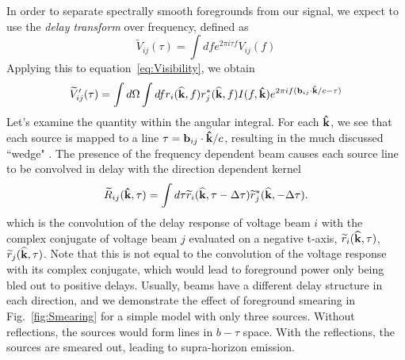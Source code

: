\documentclass[twocolumn]{emulateapj}
\begin{document}
In order to separate spectrally smooth foregrounds from our signal, we expect to use the {\it delay transform} over frequency, defined as \citep{Parsons:2012}
\begin{equation}
\widetilde{V}_{ij}(\tau) = \int d f e^{2 \pi i \tau f} V_{ij}(f)
\end{equation}
Applying this to equation~\ref{eq:Visibility}, we obtain
\begin{equation}
\widetilde{V}'_{ij}(\tau)=  \int d \Omega \int d f  r_i({\bf \widehat{k}},f) r_j^*({\bf \widehat{k}},f)  I(f,{\bf \hat{k}}) e^{2 \pi i f ( {\bf b}_{ij} \cdot {\bf \hat{k}} /c - \tau)}
\end{equation}
Let's examine the quantity within the angular integral. For each ${\bf \hat{k}}$, we see that each source is mapped to a line $\tau ={\bf b}_{ij}\cdot{\bf \hat{k}}/c$, resulting in the much discussed ``wedge" \citep{Datta:2010,Vedantham:2012,Parsons:2012,Morales:2013,Thyagarajan:2013,Liu:2014a,Liu:2014b}. The presence of the frequency dependent beam causes each source line to be convolved in delay with the direction dependent kernel
\begin{equation}\label{eq:Kernel}
\widetilde{R}_{ij}({\bf \hat{k}},\tau) = \int d \tau \widetilde{r}_i({\bf \widehat{k}},\tau - \Delta \tau) \widetilde{r}^*_j({\bf \widehat{k}},-\Delta \tau).
\end{equation}
which is the convolution of the delay response of voltage beam $i$ with the complex conjugate of voltage beam $j$ evaluated on a negative t-axis, $\widetilde{r}_i({\bf \widehat{k}},\tau)$,$\widetilde{r}_j({\bf \widehat{k}},\tau)$. Note that this is not equal to the convolution of the voltage response with its complex conjugate, which would lead to foreground power only being bled out to positive delays. Usually, beams have a different delay structure in each direction, and we demonstrate the effect of foreground smearing in Fig.~\ref{fig:Smearing} for a simple model with only three sources. Without reflections, the sources would form lines in $b-\tau$ space. With the reflections, the sources are smeared out, leading to supra-horizon emission. 
\end{document}
